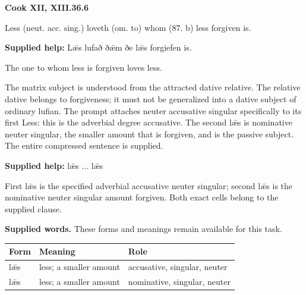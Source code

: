 \par\begin{minipage}{\linewidth}\raggedright
\textbf{Cook XII, XIII.36.6}

Less (neut. acc. sing.) loveth (om. to) whom (87. b) less forgiven is.

\textbf{Supplied help:} Lǣs lufað ðǣm ðe lǣs forgiefen is.

The one to whom less is forgiven loves less.

The matrix subject is understood from the attracted dative relative. The relative dative belongs to forgiveness; it must not be generalized into a dative subject of ordinary lufian. The prompt attaches neuter accusative singular specifically to its first Less: this is the adverbial degree accusative. The second lǣs is nominative neuter singular, the smaller amount that is forgiven, and is the passive subject. The entire compressed sentence is supplied.

\textbf{Supplied help:} lǣs ... lǣs

First lǣs is the specified adverbial accusative neuter singular; second lǣs is the nominative neuter singular amount forgiven. Both exact cells belong to the supplied clause.

\end{minipage}\par\addvspace{4pt}

\textbf{Supplied words.} These forms and meanings remain available for this task.

\par\begingroup
\fontsize{10.5}{13.2}\selectfont
\setlength{\LTleft}{0pt}\setlength{\LTright}{\fill}
\noindent
\begin{tabular}{@{}>{\raggedright\arraybackslash}p{27.92mm}>{\raggedright\arraybackslash}p{38.39mm}>{\raggedright\arraybackslash}p{52.07mm}@{}}
\toprule
\textbf{Form} & \textbf{Meaning} & \textbf{Role} \\
\midrule
lǣs & less; a smaller amount & accusative, singular, neuter \\
lǣs & less; a smaller amount & nominative, singular, neuter \\
\bottomrule
\end{tabular}
\par\endgroup

